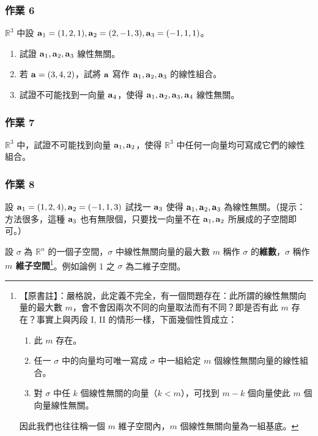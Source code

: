 \subsubsection*{作業 6}\label{hw:b6-1-6}
$\mathbb{R}^3$ 中設 $\boldsymbol{\mathbf{a}}_1=(1, 2, 1), \boldsymbol{\mathbf{a}}_2=(2, -1, 3), \boldsymbol{\mathbf{a}}_3=(-1, 1, 1)$。
\begin{enumerate}[label=(\roman*), leftmargin=2em]
  \item 試證 $\boldsymbol{\mathbf{a}}_1, \boldsymbol{\mathbf{a}}_2, \boldsymbol{\mathbf{a}}_3$ 線性無關。
  \item 若 $\boldsymbol{\mathbf{a}}=(3, 4, 2)$，試將 $\boldsymbol{\mathbf{a}}$ 寫作 $\boldsymbol{\mathbf{a}}_1, \boldsymbol{\mathbf{a}}_2, \boldsymbol{\mathbf{a}}_3$ 的線性組合。
  \item 試證不可能找到一向量 $\boldsymbol{\mathbf{a}}_4$，使得 $\boldsymbol{\mathbf{a}}_1, \boldsymbol{\mathbf{a}}_2, \boldsymbol{\mathbf{a}}_3, \boldsymbol{\mathbf{a}}_4$ 線性無關。
\end{enumerate}

\subsubsection*{作業 7}\label{hw:b6-1-7}
$\mathbb{R}^3$ 中，試證不可能找到向量 $\boldsymbol{\mathbf{a}}_1, \boldsymbol{\mathbf{a}}_2$，使得 $\mathbb{R}^3$ 中任何一向量均可寫成它們的線性組合。

\subsubsection*{作業 8}\label{hw:b6-1-8}
設 $\boldsymbol{\mathbf{a}}_1=(1, 2, 4), \boldsymbol{\mathbf{a}}_2=(-1, 1, 3)$ 試找一 $\boldsymbol{\mathbf{a}}_3$ 使得 $\boldsymbol{\mathbf{a}}_1, \boldsymbol{\mathbf{a}}_2, \boldsymbol{\mathbf{a}}_3$ 為線性無關。（提示：方法很多，這種 $\boldsymbol{\mathbf{a}}_3$ 也有無限個，只要找一向量不在 $\boldsymbol{\mathbf{a}}_1, \boldsymbol{\mathbf{a}}_2$ 所展成的子空間即可。）

\begin{definition*}[*]\label{def:b6-1-dim}
設 $\sigma$ 為 $\mathbb{R}^n$ 的一個子空間，$\sigma$ 中線性無關向量的最大數 $m$ 稱作 $\sigma$ 的\textbf{維數}，$\sigma$ 稱作 \textbf{$m$ 維子空間}\footnote{【原書註】：嚴格說，此定義不完全，有一個問題存在：此所謂的線性無關向量的最大數 $m$，會不會因兩次不同的向量取法而有不同？即是否有此 $m$ 存在？事實上與丙段 I, II 的情形一樣，下面幾個性質成立：
\begin{enumerate}[label=(\roman*), leftmargin=2em]
  \item 此 $m$ 存在。
  \item 任一 $\sigma$ 中的向量均可唯一寫成 $\sigma$ 中一組給定 $m$ 個線性無關向量的線性組合。
  \item 對 $\sigma$ 中任 $k$ 個線性無關的向量（$k < m$），可找到 $m-k$ 個向量使此 $m$ 個向量線性無關。
\end{enumerate}
因此我們也往往稱一個 $m$ 維子空間內，$m$ 個線性無關向量為一組基底。}。例如論例 1 之 $\sigma$ 為二維子空間。
\end{definition*}

